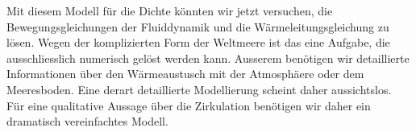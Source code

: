 Mit diesem Modell für die Dichte könnten wir jetzt versuchen, die
Bewegungsgleichungen der Fluiddynamik und die Wärmeleitungsgleichung
zu lösen.
Wegen der komplizierten Form der Weltmeere ist das eine Aufgabe,
die ausschliesslich numerisch gelöst werden kann.
Ausserem benötigen wir detaillierte Informationen über den Wärmeaustusch
mit der Atmosphäere oder dem Meeresboden.
Eine derart detaillierte Modellierung scheint daher aussichtslos.
Für eine qualitative Aussage über die Zirkulation benötigen wir daher
ein dramatisch vereinfachtes Modell.






